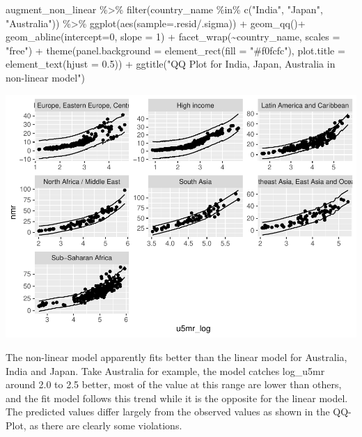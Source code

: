 \documentclass[
]{article}
\newenvironment{Shaded}{\begin{snugshade}}{\end{snugshade}}
\newcommand{\AttributeTok}[1]{\textcolor[rgb]{0.77,0.63,0.00}{#1}}
\newcommand{\DecValTok}[1]{\textcolor[rgb]{0.00,0.00,0.81}{#1}}
\newcommand{\FloatTok}[1]{\textcolor[rgb]{0.00,0.00,0.81}{#1}}
\newcommand{\FunctionTok}[1]{\textcolor[rgb]{0.00,0.00,0.00}{#1}}
\newcommand{\NormalTok}[1]{#1}
\newcommand{\SpecialCharTok}[1]{\textcolor[rgb]{0.00,0.00,0.00}{#1}}
\newcommand{\StringTok}[1]{\textcolor[rgb]{0.31,0.60,0.02}{#1}}
\begin{document}
\begin{Shaded}
\begin{Highlighting}[]
\NormalTok{augment\_non\_linear }\SpecialCharTok{\%\textgreater{}\%} 
  \FunctionTok{filter}\NormalTok{(country\_name }\SpecialCharTok{\%in\%} \FunctionTok{c}\NormalTok{(}\StringTok{"India"}\NormalTok{, }\StringTok{"Japan"}\NormalTok{, }\StringTok{"Australia"}\NormalTok{)) }\SpecialCharTok{\%\textgreater{}\%} 
  \FunctionTok{ggplot}\NormalTok{(}\FunctionTok{aes}\NormalTok{(}\AttributeTok{sample=}\NormalTok{.resid}\SpecialCharTok{/}\NormalTok{.sigma)) }\SpecialCharTok{+}
  \FunctionTok{geom\_qq}\NormalTok{()}\SpecialCharTok{+}
  \FunctionTok{geom\_abline}\NormalTok{(}\AttributeTok{intercept=}\DecValTok{0}\NormalTok{, }\AttributeTok{slope =} \DecValTok{1}\NormalTok{) }\SpecialCharTok{+}
  \FunctionTok{facet\_wrap}\NormalTok{(}\SpecialCharTok{\textasciitilde{}}\NormalTok{country\_name, }\AttributeTok{scales =} \StringTok{"free"}\NormalTok{) }\SpecialCharTok{+}
  \FunctionTok{theme}\NormalTok{(}\AttributeTok{panel.background =} \FunctionTok{element\_rect}\NormalTok{(}\AttributeTok{fill =} \StringTok{"\#f0fcfc"}\NormalTok{),}
        \AttributeTok{plot.title =} \FunctionTok{element\_text}\NormalTok{(}\AttributeTok{hjust =} \FloatTok{0.5}\NormalTok{)) }\SpecialCharTok{+}
  \FunctionTok{ggtitle}\NormalTok{(}\StringTok{"QQ Plot for India, Japan, Australia in non{-}linear model"}\NormalTok{)}
\end{Highlighting}
\end{Shaded}

\includegraphics{A2_files/figure-latex/unnamed-chunk-19-2.pdf}

The non-linear model apparently fits better than the linear model for
Australia, India and Japan. Take Australia for example, the model
catches log\_u5mr around 2.0 to 2.5 better, most of the value at this
range are lower than others, and the fit model follows this trend while
it is the opposite for the linear model. The predicted values differ
largely from the observed values as shown in the QQ-Plot, as there are
clearly some violations.
\end{document}
